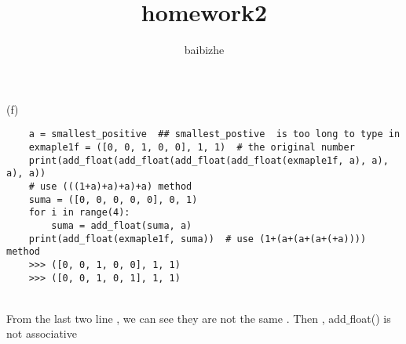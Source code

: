 \documentclass[18pt]{article}
\author{baibizhe}
\title{homework2}
\begin{document}
\maketitle
\vspace{1.5cm}
(f)\\
\begin{verbatim}
    a = smallest_positive  ## smallest_postive  is too long to type in
    exmaple1f = ([0, 0, 1, 0, 0], 1, 1)  # the original number
    print(add_float(add_float(add_float(add_float(exmaple1f, a), a), a), a))
    # use (((1+a)+a)+a)+a) method
    suma = ([0, 0, 0, 0, 0], 0, 1)
    for i in range(4):
        suma = add_float(suma, a)
    print(add_float(exmaple1f, suma))  # use (1+(a+(a+(a+(+a)))) method
    >>> ([0, 0, 1, 0, 0], 1, 1)
    >>> ([0, 0, 1, 0, 1], 1, 1)
\end{verbatim}\\
From the last two line , we can see they are not the same . Then , add$\_$float() is not associative\\
\end{document}
